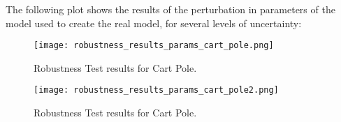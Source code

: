 \documentclass[11pt]{homework}
\begin{document}
\begin{arabicparts}
		The following plot shows the results of the perturbation in parameters of the model used to create the real model, for several levels of uncertainty:
	
		\begin{figure}[H]
			\centering
			\texttt{[image: robustness\_results\_params\_cart\_pole.png]}
			\caption{Robustness Test results for Cart Pole.}
		\end{figure}
		\begin{figure}[H]
			\centering
			\texttt{[image: robustness\_results\_params\_cart\_pole2.png]}
			\caption{Robustness Test results for Cart Pole.}
		\end{figure}

\end{arabicparts}

	
\end{document}

